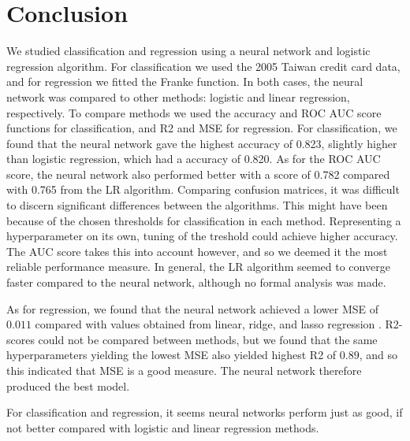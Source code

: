 \section{Conclusion}
\label{sec:conclusion}

We studied classification and regression using a neural network and logistic regression
algorithm. For classification we used the 2005 Taiwan credit card data,
and for regression we fitted the Franke function. In both cases, the neural network
was compared to other methods: logistic and linear regression, respectively.
To compare methods we used the accuracy and ROC AUC score functions for classification,
and R2 and MSE for regression. For classification, we found that the neural network gave
the highest accuracy of 0.823, slightly higher than logistic regression, which had a
accuracy of 0.820. As for the ROC AUC score, the neural network also performed better
with a score of 0.782 compared with 0.765 from the LR algorithm. Comparing confusion matrices, it was difficult to discern significant differences between the algorithms. This might have been because of the chosen thresholds for classification in each method. Representing a hyperparameter on its own, tuning of the treshold could achieve higher accuracy. The AUC score takes this into account however, and so we deemed it the most reliable performance measure. In general, the LR algorithm seemed to converge faster compared to the neural network, although no formal analysis was made.

As for regression, we found that the neural network achieved a lower MSE of $0.011$ compared
with values obtained from linear, ridge, and lasso regression \citep{prosjekt1}.
R2-scores could not be compared between methods, but we found that the same hyperparameters
yielding the lowest MSE also yielded highest R2 of $0.89$, and so this indicated that MSE is a
good measure. The neural network therefore produced the best model.

For classification and regression, it seems neural networks perform just as good, if not better compared with logistic and linear regression methods.
